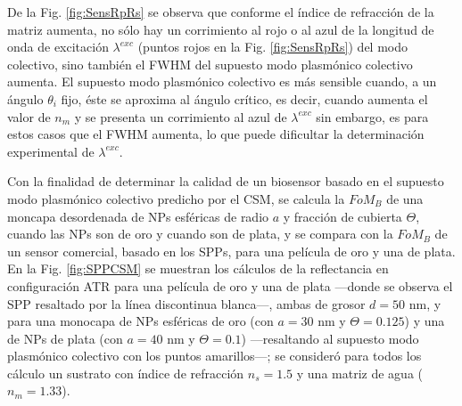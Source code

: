De la Fig. \ref{fig:SensRpRs} se observa que conforme el índice de refracción de la matriz aumenta, no sólo hay un corrimiento al rojo o al azul de la longitud de onda de excitación $\lambda^{exc}$  (puntos rojos en la Fig. \ref{fig:SensRpRs}) del modo colectivo,  sino también  el FWHM del supuesto modo  plasmónico colectivo aumenta. El supuesto modo  plasmónico colectivo es más sensible cuando, a un ángulo  $\theta_i$ fijo, éste se aproxima al ángulo crítico, es decir, cuando aumenta el valor de $n_m$ y se presenta un corrimiento al azul de $\lambda^{exc}$  sin embargo, es para estos casos que el FWHM aumenta, lo que puede dificultar la determinación experimental de $\lambda^{exc}$. 

Con la finalidad de determinar la calidad de un biosensor basado en el supuesto modo  plasmónico colectivo predicho por el CSM, se calcula la $\textit{FoM}_B$ de una moncapa desordenada de NPs esféricas de radio $a$ y fracción de cubierta $\Theta$, cuando las NPs son de oro y cuando son de plata, y se compara con la $\textit{FoM}_B$ de un sensor comercial, basado en los SPPs, para una película de oro y una de plata. En la Fig. \ref{fig:SPPCSM} se muestran los cálculos de la reflectancia en configuración ATR para una película de oro y una de plata ---donde se observa el SPP resaltado por la línea discontinua blanca---, ambas de grosor $d=50$ nm, y para una monocapa de NPs esféricas de oro (con $a=30$ nm y $\Theta=0.125$) y una de NPs de plata (con $a=40$ nm y $\Theta=0.1$) ---resaltando al supuesto modo  plasmónico colectivo con los puntos amarillos---; se consideró para todos los cálculo un sustrato con índice de refracción $n_s=1.5$ y una matriz de agua ($n_m=1.33$).

